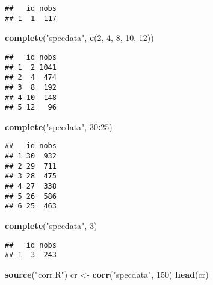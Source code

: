 \documentclass[
]{article}
\newenvironment{Shaded}{\begin{snugshade}}{\end{snugshade}}
\newcommand{\DecValTok}[1]{\textcolor[rgb]{0.00,0.00,0.81}{#1}}
\newcommand{\KeywordTok}[1]{\textcolor[rgb]{0.13,0.29,0.53}{\textbf{#1}}}
\newcommand{\NormalTok}[1]{#1}
\newcommand{\OperatorTok}[1]{\textcolor[rgb]{0.81,0.36,0.00}{\textbf{#1}}}
\newcommand{\StringTok}[1]{\textcolor[rgb]{0.31,0.60,0.02}{#1}}
\begin{document}
\begin{verbatim}
##   id nobs
## 1  1  117
\end{verbatim}

\begin{Shaded}
\begin{Highlighting}[]
\KeywordTok{complete}\NormalTok{(}\StringTok{"specdata"}\NormalTok{, }\KeywordTok{c}\NormalTok{(}\DecValTok{2}\NormalTok{, }\DecValTok{4}\NormalTok{, }\DecValTok{8}\NormalTok{, }\DecValTok{10}\NormalTok{, }\DecValTok{12}\NormalTok{))}
\end{Highlighting}
\end{Shaded}

\begin{verbatim}
##   id nobs
## 1  2 1041
## 2  4  474
## 3  8  192
## 4 10  148
## 5 12   96
\end{verbatim}

\begin{Shaded}
\begin{Highlighting}[]
\KeywordTok{complete}\NormalTok{(}\StringTok{"specdata"}\NormalTok{, }\DecValTok{30}\OperatorTok{:}\DecValTok{25}\NormalTok{)}
\end{Highlighting}
\end{Shaded}

\begin{verbatim}
##   id nobs
## 1 30  932
## 2 29  711
## 3 28  475
## 4 27  338
## 5 26  586
## 6 25  463
\end{verbatim}

\begin{Shaded}
\begin{Highlighting}[]
\KeywordTok{complete}\NormalTok{(}\StringTok{"specdata"}\NormalTok{, }\DecValTok{3}\NormalTok{)}
\end{Highlighting}
\end{Shaded}

\begin{verbatim}
##   id nobs
## 1  3  243
\end{verbatim}

\begin{Shaded}
\begin{Highlighting}[]
\KeywordTok{source}\NormalTok{(}\StringTok{"corr.R"}\NormalTok{)}
\NormalTok{cr <-}\StringTok{ }\KeywordTok{corr}\NormalTok{(}\StringTok{"specdata"}\NormalTok{, }\DecValTok{150}\NormalTok{)}
\KeywordTok{head}\NormalTok{(cr)}
\end{Highlighting}
\end{Shaded}
\end{document}
